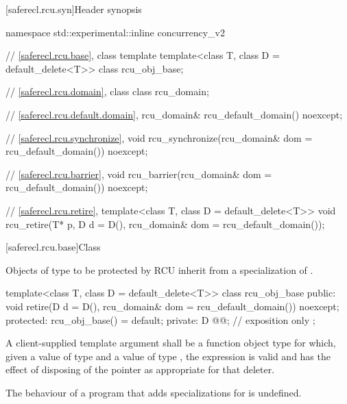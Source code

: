 [saferecl.rcu.syn]{Header  synopsis}

\begin{codeblock}
namespace std::experimental::inline concurrency_v2 {
  // \ref{saferecl.rcu.base}, class template 
  template<class T, class D = default_delete<T>>
    class rcu_obj_base;

  // \ref{saferecl.rcu.domain}, class 
  class rcu_domain;

  // \ref{saferecl.rcu.default.domain}, 
  rcu_domain& rcu_default_domain() noexcept;

  // \ref{saferecl.rcu.synchronize}, 
  void rcu_synchronize(rcu_domain& dom = rcu_default_domain()) noexcept;

  // \ref{saferecl.rcu.barrier}, 
  void rcu_barrier(rcu_domain& dom = rcu_default_domain()) noexcept;

  // \ref{saferecl.rcu.retire}, 
  template<class T, class D = default_delete<T>>
    void rcu_retire(T* p, D d = D(), rcu_domain& dom = rcu_default_domain());
}
\end{codeblock}

[saferecl.rcu.base]{Class }


Objects of type  to be protected by RCU inherit from a
specialization of .


\begin{codeblock}
template<class T, class D = default_delete<T>>
class rcu_obj_base {
public:
  void retire(D d = D(), rcu_domain& dom = rcu_default_domain()) noexcept;
protected:
  rcu_obj_base() = default;
private:
  D @@;            // exposition only
};
\end{codeblock}

A client-supplied template argument  shall be a
function object type  for which,
given a value  of type  and a value 
of type , the expression  is valid and
has the effect of disposing of the pointer as appropriate for
that deleter.

The behaviour of a program that adds specializations for
 is undefined.

